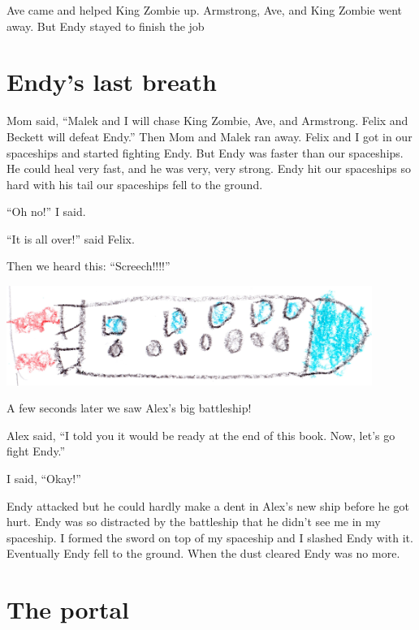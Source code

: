 \documentclass[letterpaper, oneside, 12pt]{krantz}
\begin{document}
Ave came and helped King Zombie up. Armstrong, Ave, and King Zombie went
away. But Endy stayed to finish the job

\hypertarget{endys-last-breath}{%
\section{Endy's last breath}\label{endys-last-breath}}

Mom said, ``Malek and I will chase King Zombie, Ave, and Armstrong.
Felix and Beckett will defeat Endy.'' Then Mom and Malek ran away. Felix
and I got in our spaceships and started fighting Endy. But Endy was
faster than our spaceships. He could heal very fast, and he was very,
very strong. Endy hit our spaceships so hard with his tail our
spaceships fell to the ground.

``Oh no!'' I said.

``It is all over!'' said Felix.

Then we heard this: ``Screech!!!!''

\includegraphics[width=4.6875in,height=\textheight]{img/four-bad-guys/longrocket.jpg}

A few seconds later we saw Alex's big battleship!

Alex said, ``I told you it would be ready at the end of this book. Now,
let's go fight Endy.''

I said, ``Okay!''

Endy attacked but he could hardly make a dent in Alex's new ship before
he got hurt. Endy was so distracted by the battleship that he didn't see
me in my spaceship. I formed the sword on top of my spaceship and I
slashed Endy with it. Eventually Endy fell to the ground. When the dust
cleared Endy was no more.

\hypertarget{the-portal}{%
\section{The portal}\label{the-portal}}
\end{document}
